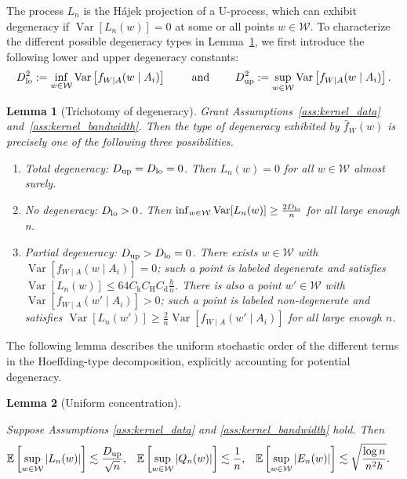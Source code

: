 \documentclass[11pt,lof]{puthesis}
\newcommand{\E}{\ensuremath{\mathbb{E}}}
\newcommand{\rH}{\ensuremath{\mathrm{H}}}
\newcommand{\rk}{\ensuremath{\mathrm{k}}}
\newcommand{\rd}{\ensuremath{\mathrm{d}}}
\newcommand{\cW}{\ensuremath{\mathcal{W}}}
\newcommand{\Dl}{\ensuremath{D_{\textup{lo}}}}
\newcommand{\Du}{\ensuremath{D_{\textup{up}}}}
\DeclareMathOperator{\Var}{Var}
\theoremstyle{break}
\newtheorem{lemma}{Lemma}[section]
\theoremstyle{proof}
\begin{document}
The process $L_n$ is the H{\'a}jek projection of a U-process,
which can exhibit degeneracy if $\Var[L_n(w)] = 0$ at some
or all points $w \in \cW$. To characterize the different possible
degeneracy types in Lemma~\ref{lem:kernel_trichotomy},
we first introduce the following lower and upper degeneracy constants:
%
\begin{align*}
\Dl^2 := \inf_{w \in \cW} \Var\left[f_{W \mid A}(w \mid A_i)\right]
\qquad \text{ and } \qquad
\Du^2 := \sup_{w \in \cW} \Var\left[f_{W \mid A}(w \mid A_i)\right].
\end{align*}
%
\begin{lemma}[Trichotomy of degeneracy]%
\label{lem:kernel_trichotomy}%
%
Grant Assumptions~\ref{ass:kernel_data} and~\ref{ass:kernel_bandwidth}.
Then the type of degeneracy exhibited by $\hat f_W(w)$
is precisely one of the following three possibilities.
%
\begin{enumerate}[label=(\roman*)]

\item Total degeneracy:
$\Du = \Dl = 0$. Then $L_n(w) = 0$ for all $w \in \cW$ almost surely.

\item No degeneracy:
$\Dl > 0$. Then $\inf_{w \in \cW} \Var[L_n(w)] \geq \frac{2 \Dl}{n}$
for all large enough n.

\item Partial degeneracy:
$\Du > \Dl = 0$. There exists $w \in \cW$ with
$\Var\left[f_{W \mid A}(w \mid A_i)\right] = 0$;
such a point is labeled \emph{degenerate} and satisfies
$\Var[L_n(w)] \leq 64 C_\rk C_\rH C_\rd \frac{h}{n}$.
There is also a point $w' \in \cW$ with
$\Var\left[f_{W \mid A}(w' \mid A_i)\right] > 0$;
such a point is labeled \emph{non-degenerate} and satisfies
$\Var[L_n(w')] \geq
\frac{2}{n} \Var\left[f_{W \mid A}(w' \mid A_i)\right]$
for all large enough $n$.

\end{enumerate}

\end{lemma}

The following lemma describes the uniform stochastic order of the different
terms in the Hoeffding-type decomposition, explicitly accounting for potential
degeneracy.

\begin{lemma}[Uniform concentration]
\label{lem:kernel_uniform_concentration}

Suppose Assumptions \ref{ass:kernel_data} and
\ref{ass:kernel_bandwidth} hold. Then
%
\begin{align*}
\E\left[ \sup_{w \in \cW} |L_n(w)| \right]
&\lesssim \frac{\Du}{\sqrt n},
&\E\left[ \sup_{w \in \cW} |Q_n(w)| \right]
&\lesssim \frac{1}{n},
&\E\left[ \sup_{w \in \cW} |E_n(w)| \right]
&\lesssim \sqrt{\frac{\log n}{n^2h}}.
\end{align*}
\end{lemma}
\end{document}
